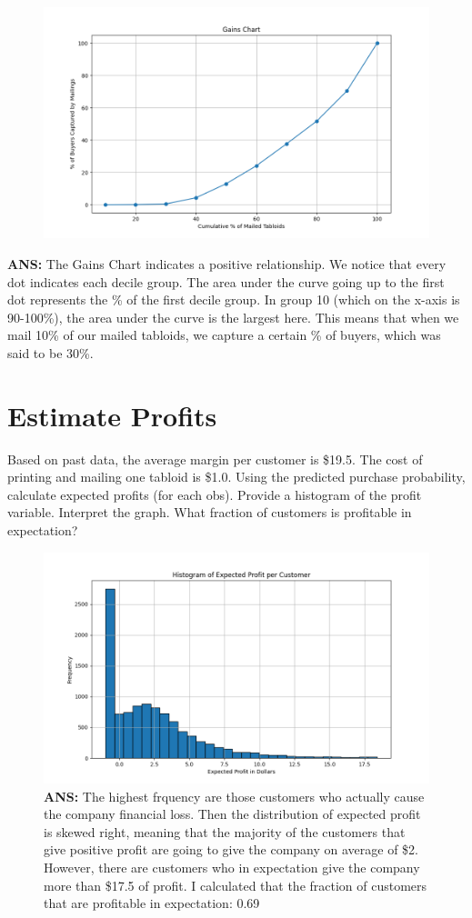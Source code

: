 \documentclass[a4paper,12pt]{article}
\begin{document}
\begin{figure}[H]
\centering
\includegraphics[width=1\textwidth]{figure_3.png}
\label{Gains Chart}
\end{figure}
\textbf{ANS:} 
The Gains Chart indicates a positive relationship. We notice that every dot indicates 
each decile group. The area under the curve going up to the first dot represents 
the \% of the first decile group. In group 10 (which on the x-axis is 90-100\%),
the area under the curve is the largest here. This means that when we mail 10\% of our
mailed tabloids, we capture a certain \% of buyers, which was said to be 30\%.

\section{Estimate Profits}
Based on past data, the average margin per customer is \$19.5.
The cost of printing and mailing one tabloid is \$1.0. Using the predicted purchase
probability, calculate expected profits (for each obs). Provide a histogram of the profit
variable. Interpret the graph. What fraction of customers is profitable in expectation?
\begin{figure}[H]
\centering
\includegraphics[width=1\textwidth]{figure_4.png}
\textbf{ANS:} 
The highest frquency are those customers who actually cause the company financial 
loss. Then the distribution of expected profit is skewed right, meaning that the majority
of the customers that give positive profit are going to give the company on average of
\$2. However, there are customers who in expectation give the company more than 
\$17.5 of profit.
I calculated that the fraction of customers that are profitable in expectation: 0.69

\label{Gains Chart}
\end{figure}
\end{document}
